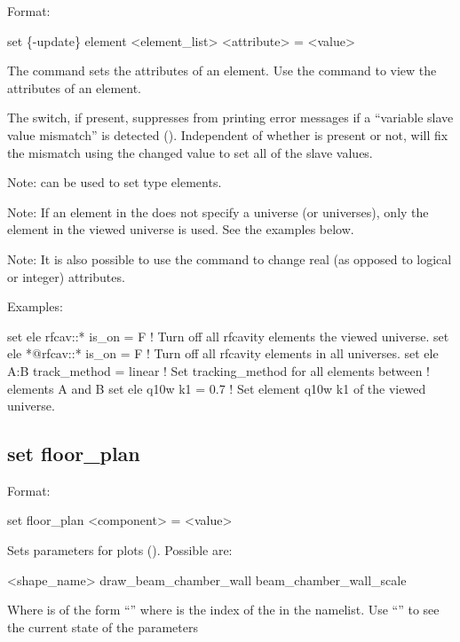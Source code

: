 {{Format:
\begin{example}
  set \{-update\} element <element_list> <attribute> = <value>
\end{example}

The  command sets the attributes of an element. Use the 
command to view the attributes of an element.

The  switch, if present, suppresses \tao from printing error messages if a ``variable
slave value mismatch'' is detected (). Independent of whether  is
present or not, \tao will fix the mismatch using the changed value to set all of the slave values.

Note:  can be used to set  type elements.

Note: If an element in the  does not specify a universe (or universes),
only the element in the viewed universe is used. See the examples below.

Note: It is also possible to use the  command to change
real (as opposed to logical or integer) attributes.

Examples:
\begin{example}
  set ele rfcav::* is_on = F        ! Turn off all rfcavity elements the viewed universe.
  set ele *@rfcav::* is_on = F      ! Turn off all rfcavity elements in all universes.
  set ele A:B track_method = linear ! Set tracking_method for all elements between 
                                    !   elements A and B
  set ele q10w k1 = 0.7             ! Set element q10w k1 of the viewed universe.
\end{example}


\subsection{set floor_plan}
\label{s:set.floor.plan}

Format:
\begin{example}
  set floor_plan <component> = <value>
\end{example}


Sets parameters for  plots ().  Possible
 are:
\begin{example}
  <shape_name>%
  draw_beam_chamber_wall
  beam_chamber_wall_scale
\end{example}
Where  is of the form ``'' where  is the index
of the  in the  namelist.  Use ``'' to see the current state of the  parameters

}}
